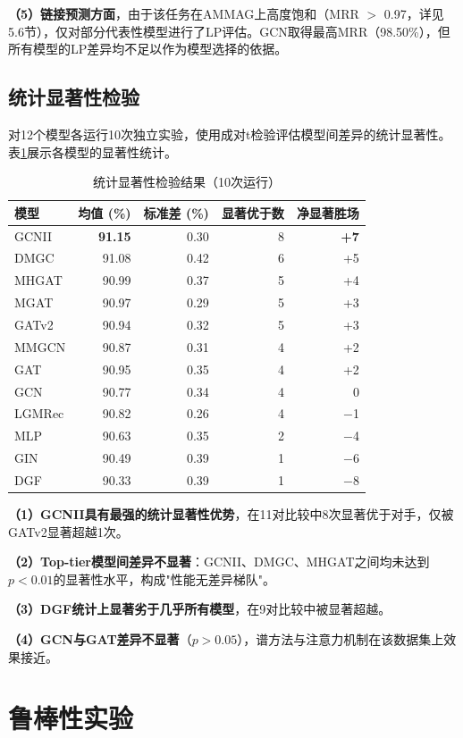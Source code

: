\textbf{（5）链接预测方面}，由于该任务在AMMAG上高度饱和（MRR $>$ 0.97，详见5.6节），仅对部分代表性模型进行了LP评估。GCN取得最高MRR（98.50\%），但所有模型的LP差异均不足以作为模型选择的依据。

\subsection{统计显著性检验}

对12个模型各运行10次独立实验，使用成对t检验评估模型间差异的统计显著性。表\ref{tab:significance}展示各模型的显著性统计。

\begin{table}[htbp]
  \centering
  \caption{统计显著性检验结果（10次运行）}
  \label{tab:significance}
  \begin{tabular}{lrrrr}
    \toprule
    模型 & 均值 (\%) & 标准差 (\%) & 显著优于数 & 净显著胜场 \\
    \midrule
    GCNII & \textbf{91.15} & 0.30 & 8 & \textbf{+7} \\
    DMGC & 91.08 & 0.42 & 6 & +5 \\
    MHGAT & 90.99 & 0.37 & 5 & +4 \\
    MGAT & 90.97 & 0.29 & 5 & +3 \\
    GATv2 & 90.94 & 0.32 & 5 & +3 \\
    MMGCN & 90.87 & 0.31 & 4 & +2 \\
    GAT & 90.95 & 0.35 & 4 & +2 \\
    GCN & 90.77 & 0.34 & 4 & 0 \\
    LGMRec & 90.82 & 0.26 & 4 & $-$1 \\
    MLP & 90.63 & 0.35 & 2 & $-$4 \\
    GIN & 90.49 & 0.39 & 1 & $-$6 \\
    DGF & 90.33 & 0.39 & 1 & $-$8 \\
    \bottomrule
  \end{tabular}
\end{table}

\textbf{（1）GCNII具有最强的统计显著性优势}，在11对比较中8次显著优于对手，仅被GATv2显著超越1次。

\textbf{（2）Top-tier模型间差异不显著}：GCNII、DMGC、MHGAT之间均未达到$p < 0.01$的显著性水平，构成"性能无差异梯队"。

\textbf{（3）DGF统计上显著劣于几乎所有模型}，在9对比较中被显著超越。

\textbf{（4）GCN与GAT差异不显著}（$p > 0.05$），谱方法与注意力机制在该数据集上效果接近。

\section{鲁棒性实验}

